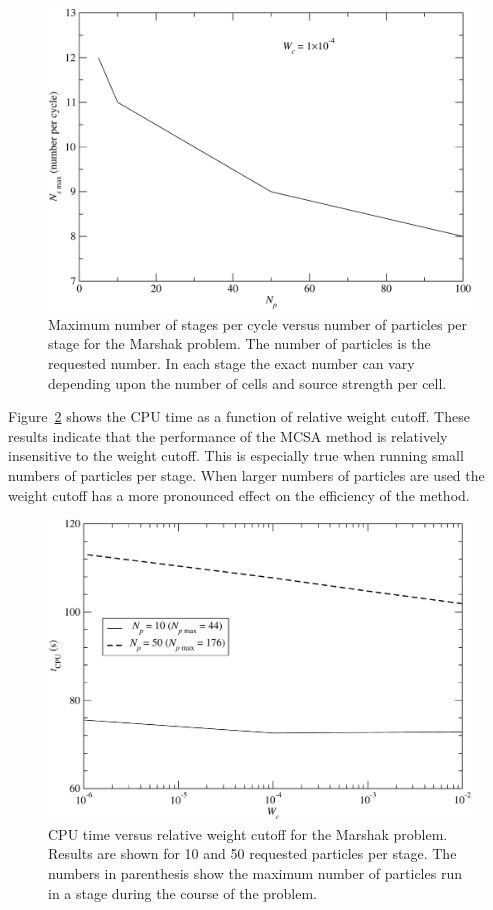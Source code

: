 \documentclass[preprint,12pt]{elsarticle}
\begin{document}
\begin{figure}[h!]
  \centerline{ \includegraphics[width=5in,clip]{mrshk_np_Ns.pdf}}
  \caption{ Maximum number of stages per cycle versus number of
    particles per stage for the Marshak problem.  The number of
    particles is the requested number.  In each stage the exact number
    can vary depending upon the number of cells and source strength
    per cell.}
  \label{fig:CPU_Ns}
\end{figure}

Figure~\ref{fig:CPU_wc} shows the CPU time as a function of relative
weight cutoff.  These results indicate that the performance of the
MCSA method is relatively insensitive to the weight cutoff.  This is
especially true when running small numbers of particles per stage.
When larger numbers of particles are used the weight cutoff has a more
pronounced effect on the efficiency of the method.

\begin{figure}[h!]
  \centerline{ \includegraphics[width=5in,clip]{mrshk_wc_CPU.pdf}}
  \caption{ CPU time versus relative weight cutoff for the Marshak
    problem.  Results are shown for 10 and 50 requested particles per
    stage.  The numbers in parenthesis show the maximum number of
    particles run in a stage during the course of the problem.}
  \label{fig:CPU_wc}
\end{figure}
\end{document}

